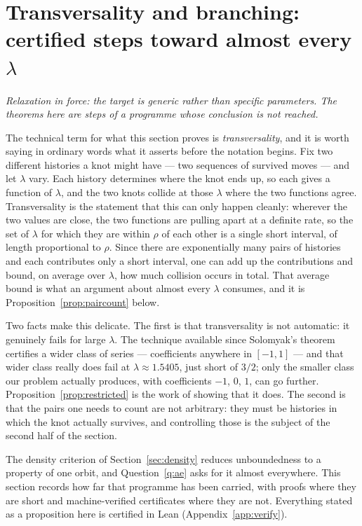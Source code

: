 \documentclass[11pt,reqno]{amsart}
\theoremstyle{plain}
\theoremstyle{definition}
\theoremstyle{remark}
\begin{document}
\section{Transversality and branching: certified steps toward almost every
\texorpdfstring{$\lambda$}{lambda}}\label{sec:transversality}

\emph{Relaxation in force: the target is generic rather than specific
parameters. The theorems here are steps of a programme whose conclusion is not
reached.}

The technical term for what this section proves is \emph{transversality}, and
it is worth saying in ordinary words what it asserts before the notation
begins. Fix two different histories a knot might have --- two sequences of
survived moves --- and let $\lambda$ vary. Each history determines where the
knot ends up, so each gives a function of $\lambda$, and the two knots collide
at those $\lambda$ where the two functions agree. Transversality is the
statement that this can only happen cleanly: wherever the two values are close,
the two functions are pulling apart at a definite rate, so the set of $\lambda$
for which they are within $\rho$ of each other is a single short interval, of
length proportional to $\rho$. Since there are exponentially many pairs of
histories and each contributes only a short interval, one can add up the
contributions and bound, on average over $\lambda$, how much collision occurs
in total. That average bound is what an argument about almost every $\lambda$
consumes, and it is Proposition~\ref{prop:paircount} below.

Two facts make this delicate. The first is that transversality is not
automatic: it genuinely fails for large $\lambda$. The technique available
since Solomyak's theorem certifies a wider class of series --- coefficients
anywhere in $[-1,1]$ --- and that wider class really does fail at
$\lambda\approx1.5405$, just short of $3/2$; only the smaller class our
problem actually produces, with coefficients $-1$, $0$, $1$, can go further.
Proposition~\ref{prop:restricted} is the work of showing that it does. The second
is that the pairs one needs to count are not arbitrary: they must be histories
in which the knot actually survives, and controlling those is the subject of
the second half of the section.

The density criterion of Section~\ref{sec:density} reduces unboundedness to a
property of one orbit, and Question~\ref{q:ae} asks for it almost everywhere.
This section records how far that programme has been carried, with proofs
where they are short and machine-verified certificates where they are not.
Everything stated as a proposition here is certified in Lean
(Appendix~\ref{app:verify}).
\end{document}
